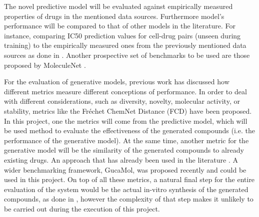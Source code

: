 \documentclass{article}
\begin{document}
The novel predictive model will be evaluated against empirically measured properties of
 drugs in the mentioned data sources. Furthermore model's performance will be compared
 to that of other models in the literature. For instance, comparing IC50 prediction
 values for cell-drug pairs (unseen during training) to the empirically measured ones
 from the previously mentioned data sources as done in \cite{Oskooei2019, Joo2019,
 Oskooei2018}. Another prospective set of benchmarks to be used are those proposed by
 MoleculeNet \cite{Wu2018}.

For the evaluation of generative models, previous work \cite{Theis2016} has discussed
 how different metrics measure different conceptions of performance. In order to deal
 with different considerations, such as diversity, novelty, molecular activity, or
 stability, metrics like the Fréchet ChemNet Distance (FCD) \cite{Preuer} have been
 proposed. In this project, one the metrics will come from the predictive model, which
 will be used method to evaluate the effectiveness of the generated compounds (i.e. the
 performance of the generative model). At the same time, another metric for the
 generative model will be the similarity of the generated compounds to already existing
 drugs. An approach that has already been used in the literature \cite{Born2019}. A
 wider benchmarking framework, GucaMol, was proposed recently \cite{Brown2019} and could
 be used in this project. On top of all these metrics, a natural final step for the
 entire evaluation of the system would be the actual in-vitro synthesis of the generated
 compounds, as done in \cite{Zhavoronkov2019}, however the complexity of that step makes
 it unlikely to be carried out during the execution of this project. 









    
\end{document}
